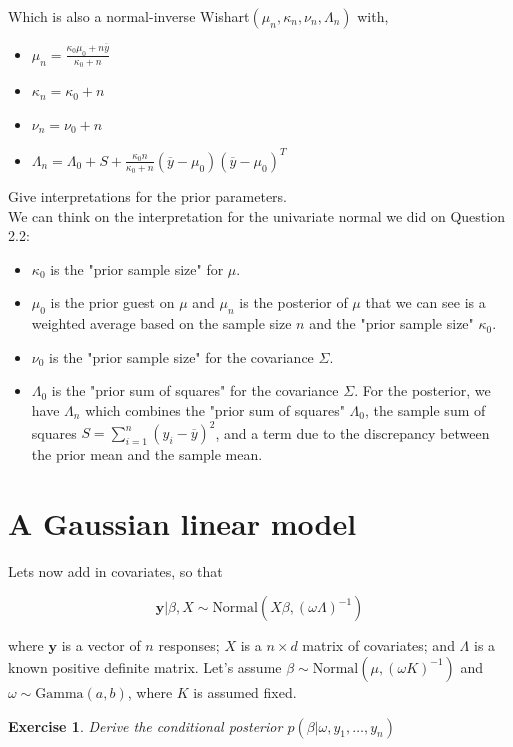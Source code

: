 \documentclass[twoside]{article}
\newcounter{lecnum}
\newtheorem{exercise}{Exercise}[lecnum]
\begin{document}
 Which is also a normal-inverse Wishart$(\mu_n, \kappa_n, \nu_n, \Lambda_n)$ with,
 \begin{itemize}
 	\item $\mu_n = \frac{\kappa_0 \mu_0 + n\overline{y}}{\kappa_0 + n} $
 	\item $ \kappa_n = \kappa_0+n $
 	\item $ \nu_n = \nu_0+n$
 	\item $ \Lambda_n = \Lambda_0 + S +  \frac{\kappa_0 n}{\kappa_0 + n}(\overline{y}-\mu_0)(\overline{y}-\mu_0)^T  $
 \end{itemize}
 
Give interpretations for the prior parameters. \\

We can think on the interpretation for the univariate normal we did on Question 2.2:
\begin{itemize}
	\item $\kappa_0$ is the "prior sample size" for $\mu$.
	\item $\mu_0$ is the prior guest on $\mu$ and $\mu_n$ is the posterior of $\mu$ that we can see is a weighted average based on the sample size $n$ and the "prior sample size" $\kappa_0$.
	\item $\nu_0$ is the "prior sample size" for the covariance $\Sigma$.
	\item $\Lambda_0$ is the "prior sum of squares" for the covariance $\Sigma$. For the posterior, we have $\Lambda_n$ which combines the "prior sum of squares" $\Lambda_0$, the sample sum of squares $S=\sum_{i=1}^{n} (y_i - \overline{y})^2$, and a term due to the discrepancy between the prior mean and the sample mean.
\end{itemize}

\color{black}


\newpage
\section{A Gaussian linear model}
Lets now add in covariates, so that

$$\mathbf{y}|\beta, X \sim \mbox{Normal}(X\beta, (\omega \Lambda)^{-1})$$

where $\mathbf{y}$ is a vector of $n$ responses; $X$ is a $n\times d$ matrix of covariates; and $\Lambda$ is a known positive definite matrix.
Let's assume $\beta\sim \mbox{Normal}(\mu, (\omega K)^{-1})$ and $\omega \sim \mbox{Gamma}(a,b)$, where $K$ is assumed fixed.


\begin{exercise}
  Derive the conditional posterior $p(\beta|\omega, y_1,\dots, y_n)$
\end{exercise}
\end{document}
